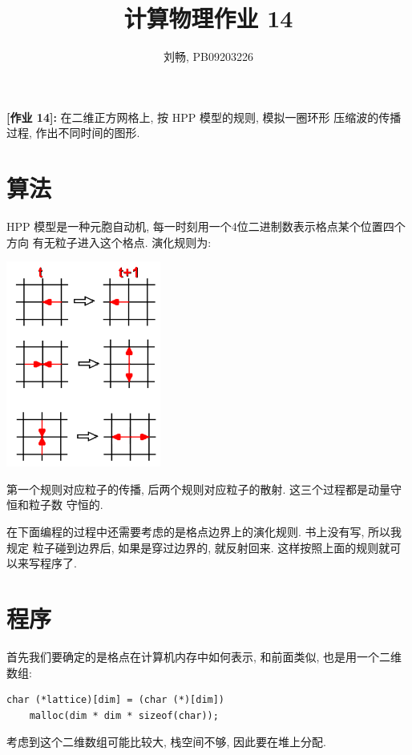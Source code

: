 \documentclass{ctexart}
\begin{document}
\title{计算物理作业 14}
\author{刘畅, PB09203226}
\maketitle

{\bf [作业 14]:} 在二维正方网格上, 按 HPP 模型的规则, 模拟一圈环形
压缩波的传播过程, 作出不同时间的图形.

\section{算法}
HPP 模型是一种元胞自动机, 每一时刻用一个4位二进制数表示格点某个位置四个方向
有无粒子进入这个格点. 演化规则为:
\begin{center}
\includegraphics[width=2in]{hpp.png}
\end{center}
第一个规则对应粒子的传播, 后两个规则对应粒子的散射. 这三个过程都是动量守恒和粒子数
守恒的.

在下面编程的过程中还需要考虑的是格点边界上的演化规则. 书上没有写, 所以我规定
粒子碰到边界后, 如果是穿过边界的, 就反射回来. 这样按照上面的规则就可以来写程序了.

\section{程序}
首先我们要确定的是格点在计算机内存中如何表示, 和前面类似, 也是用一个二维数组:
\begin{verbatim}
char (*lattice)[dim] = (char (*)[dim])
    malloc(dim * dim * sizeof(char));
\end{verbatim}
考虑到这个二维数组可能比较大, 栈空间不够, 因此要在堆上分配.
\end{document}
